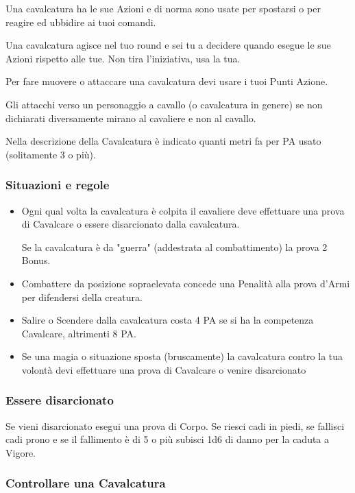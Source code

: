 \documentclass[12pt,a4paper,twoside,openany]{book}
\begin{document}
\begin{multicols}{2}
Una cavalcatura ha le sue Azioni e di norma sono usate per spostarsi o per reagire ed ubbidire ai tuoi comandi.

Una cavalcatura agisce nel tuo round e sei tu a decidere quando esegue le sue Azioni rispetto alle tue. Non tira l'iniziativa, usa la tua.

Per fare muovere o attaccare una cavalcatura devi usare i tuoi Punti Azione.

Gli attacchi verso un personaggio a cavallo (o cavalcatura in genere) se non dichiarati diversamente mirano al cavaliere e non al cavallo.

Nella descrizione della Cavalcatura è indicato quanti metri fa per PA usato (solitamente 3 o più).

\subsubsection{Situazioni e regole}\label{cavallosituazioniregole}

\begin{itemize}
\item
Ogni qual volta la cavalcatura è colpita il cavaliere deve effettuare una prova di Cavalcare o essere disarcionato dalla cavalcatura.

Se la cavalcatura è da "guerra" (addestrata al combattimento) la prova 2 Bonus.

\item
Combattere da posizione sopraelevata concede una Penalità alla prova d'Armi per difendersi della creatura.

\item
Salire o Scendere dalla cavalcatura costa 4 PA se si ha la competenza Cavalcare, altrimenti 8 PA.

\item
Se una magia o situazione sposta (bruscamente) la cavalcatura contro la tua volontà devi effettuare una prova di Cavalcare o venire disarcionato
\end{itemize}


\subsubsection{Essere disarcionato}\label{esseredisarcionato}

Se vieni disarcionato esegui una prova di Corpo. Se riesci cadi in piedi, se fallisci cadi prono e se il fallimento è di 5 o più subisci 1d6 di danno per la caduta a Vigore.


\subsubsection{Controllare una Cavalcatura}\label{controllocavalcatura}


\end{multicols}
\end{document}
